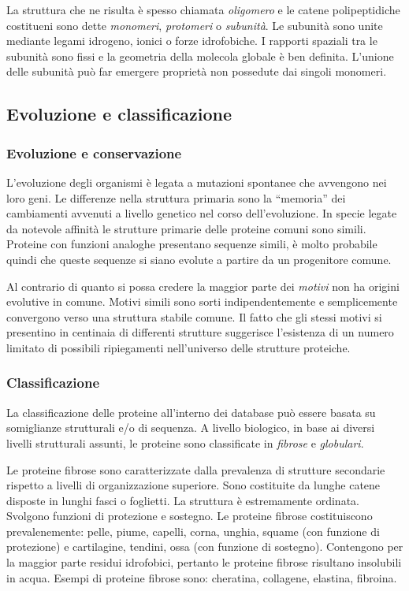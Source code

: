 {{La struttura che ne risulta è spesso chiamata \textit{oligomero} e le catene polipeptidiche costitueni sono dette \textit{monomeri}, \textit{protomeri} o \textit{subunità}. Le subunità sono unite mediante legami idrogeno, ionici o forze idrofobiche. I rapporti spaziali tra le subunità sono fissi e la geometria della molecola globale è ben definita.
L'unione delle subunità può far emergere proprietà non possedute dai singoli monomeri.
}
\subsection{Evoluzione e classificazione}
{
\subsubsection{Evoluzione e conservazione}
L’evoluzione degli organismi è legata a mutazioni spontanee che avvengono nei loro geni. Le differenze nella struttura primaria sono la “memoria” dei cambiamenti avvenuti a livello genetico nel corso dell’evoluzione. In specie legate da notevole affinità le strutture primarie delle proteine comuni sono
simili. Proteine con funzioni analoghe presentano sequenze simili, è molto probabile quindi che queste sequenze si siano evolute a partire da un progenitore comune. 

\par Al contrario di quanto si possa credere la maggior parte dei \textit{motivi} non ha origini evolutive in comune. Motivi simili sono sorti indipendentemente e semplicemente convergono verso una struttura stabile comune. Il fatto che gli stessi motivi si presentino in centinaia di differenti strutture suggerisce l'esistenza di un numero limitato di possibili ripiegamenti nell'universo delle strutture proteiche\supercite{proteinMotifs}. 

\subsubsection{Classificazione} \label{sec:classificazione}
La classificazione delle proteine all'interno dei database può essere basata su somiglianze strutturali e/o di sequenza. A livello biologico, in base ai diversi livelli strutturali assunti, le proteine sono classificate in \textit{fibrose} e \textit{globulari}.

\par Le proteine fibrose sono caratterizzate dalla prevalenza di strutture secondarie rispetto a livelli di organizzazione superiore. Sono costituite da lunghe catene disposte in lunghi fasci o foglietti. La struttura è estremamente ordinata. Svolgono funzioni di protezione e sostegno. Le proteine fibrose costituiscono prevalenemente: pelle, piume, capelli, corna, unghia, squame (con funzione di protezione) e cartilagine, tendini, ossa (con funzione di sostegno). Contengono per la maggior parte residui idrofobici, pertanto le proteine fibrose risultano insolubili in acqua. Esempi di proteine fibrose sono: cheratina, collagene, elastina, fibroina. 

}}
